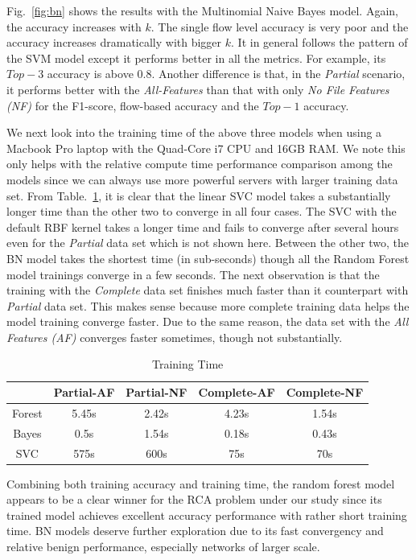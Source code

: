 Fig.~\ref{fig:bn} shows the results with the Multinomial Naive Bayes model. Again, the accuracy increases with $k$. The single flow level accuracy is very poor and the accuracy increases dramatically with bigger $k$. 
It in general follows the pattern of the SVM model except it performs better in all the metrics. For example, its $Top-3$ accuracy is above $0.8$. Another difference is that, in the {\it Partial} scenario, it performs better with the {\it All-Features} than that with only {\it No File Features (NF) } for the F1-score, flow-based accuracy and the $Top-1$ accuracy.

We next look into the training time of the above three models when using a Macbook Pro laptop with the Quad-Core i7 CPU and 16GB RAM. We note this only helps with the relative compute time performance comparison among the models since we can always use more powerful servers with larger training data set. From Table.~\ref{tab:time}, it is clear that the linear SVC model takes a substantially longer time than the other two to converge in all four cases. The SVC with the default RBF kernel takes a longer time and fails to converge after several hours even for the {\it Partial} data set which is not shown here. Between the other two, the BN model takes the shortest time (in sub-seconds) though all the Random Forest model trainings converge in a few seconds. The next observation is that the training with the {\it Complete} data set finishes much faster than it counterpart with {\it Partial} data set. This makes sense because more complete training data helps the model training converge faster. Due to the same reason, the data set with the {\it All Features (AF)} converges faster sometimes, though not substantially.

\begin{table}[!ht]
\caption{Training Time }
\label{tab:time}
\begin{center}
\begin{tabular}{ |c|c|c|c|c| } 
 \hline
  & Partial-AF & Partial-NF & Complete-AF & Complete-NF\\ 
 \hline
 Forest & 5.45s & 2.42s & 4.23s & 1.54s\\ 
 \hline
 Bayes & 0.5s & 1.54s & 0.18s & 0.43s\\
 \hline
 SVC & 575s & 600s & 75s &70s\\ 
 \hline
\end{tabular}
\end{center}
\end{table}
Combining both training accuracy and training time, the random forest model appears to be a clear winner for the RCA problem under our study since its trained model achieves excellent accuracy performance with rather short training time. BN models deserve further exploration due to its fast convergency and relative benign performance, especially networks of larger scale.

